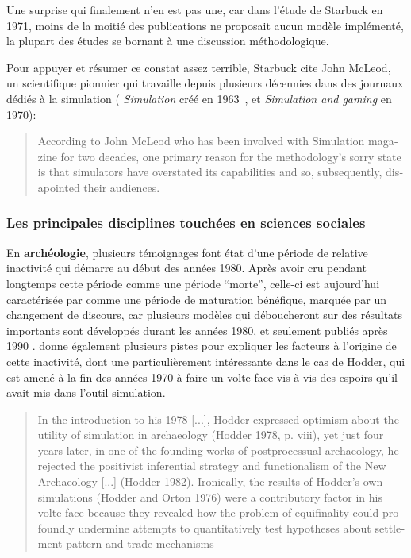 Une surprise qui finalement n'en est pas une, car dans l'étude de Starbuck en 1971, moins de la moitié des publications ne proposait aucun modèle implémenté, la plupart des études se bornant à une discussion méthodologique.

Pour appuyer et résumer ce constat assez terrible, Starbuck cite John McLeod, un scientifique pionnier qui travaille depuis plusieurs décennies dans des journaux dédiés à la simulation ( \textit{Simulation} créé en 1963 , et \textit{Simulation and gaming} en 1970): 

\foreignblockquote{english}[\cite{Starbuck1983}]{According to  John McLeod who has been involved with Simulation magazine for two decades, one primary reason for the methodology's sorry state is that simulators have overstated its capabilities and so, subsequently, disapointed their audiences.}

\subsubsection{Les principales disciplines touchées en sciences sociales}
\label{ssec:disciplines_touches}

En \textbf{archéologie}, plusieurs témoignages \autocite[6-7]{Lake2013} font état d'une période de relative inactivité  qui démarre au début des années 1980. Après avoir cru pendant longtemps cette période comme une période \enquote{morte}, celle-ci est aujourd'hui caractérisée par \textcite{Lake2013} comme une période de maturation bénéfique, marquée par un changement de discours, car plusieurs modèles qui déboucheront sur des résultats importants sont développés durant les années 1980, et seulement publiés après 1990 . \textcite{Lake2013} donne également plusieurs pistes pour expliquer les facteurs à l'origine de cette inactivité, dont une particulièrement intéressante dans le cas de Hodder, qui est amené à la fin des années 1970 à faire un volte-face vis à vis des espoirs qu'il avait mis dans l'outil simulation.

\foreignblockquote{english}[{\cite[7]{Lake2013}}]{In the introduction to his 1978 [...], Hodder expressed optimism about the utility of simulation in archaeology (Hodder 1978, p. viii), yet just four years later, in one of the founding works of postprocessual archaeology, he rejected the positivist inferential strategy and functionalism of the New Archaeology [...] (Hodder 1982). Ironically, the results of Hodder's own simulations (Hodder and Orton 1976) were a contributory factor in his volte-face because they revealed how the problem of equifinality could profoundly undermine attempts to quantitatively test hypotheses about settlement pattern and trade mechanisms}

